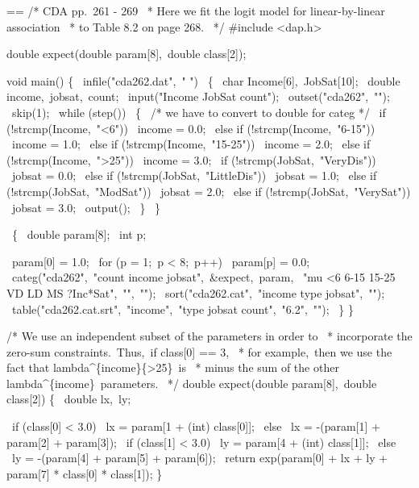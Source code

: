 \documentclass{book}
\makeatletter
\newenvironment{Texinfopreformatted}{%
  \par\GNUTobeylines\obeyspaces\frenchspacing\parskip=\z@\parindent=\z@}{}
{\catcode`\^^M=13 \gdef\GNUTobeylines{\catcode`\^^M=13 \def^^M{\null\par}}}
\newenvironment{Texinfoindented}{\begin{list}{}{}\item\relax}{\end{list}}
\renewcommand{\_}{\Texinfounderscore\discretionary{}{}{}}
\makeatother
\begin{document}
\begin{Texinfoindented}
\begin{Texinfopreformatted}%
\ttfamily 
/* CDA pp.\ 261 - 269
\ * Here we fit the logit model for linear-by-linear association
\ * to Table 8.2 on page 268.
\ */
\#include <dap.h>

double expect(double param[8],\ double class[2]);

void main()
\{
\  infile("cda262.dat",\ " ")
\    \{
\      char Income[6],\ JobSat[10];
\      double income,\ jobsat,\ count;
\      input("Income JobSat count");
\      outset("cda262",\ "");
\      skip(1);
\      while (step()) 
\        \{
\          /* we have to convert to double for categ */
\          if (!strcmp(Income,\ "<6"))
\            income = 0.0;
\          else if (!strcmp(Income,\ "6-15"))
\            income = 1.0;
\          else if (!strcmp(Income,\ "15-25"))
\            income = 2.0;
\          else if (!strcmp(Income,\ ">25"))
\            income = 3.0;
\          if (!strcmp(JobSat,\ "VeryDis"))
\            jobsat = 0.0;
\          else if (!strcmp(JobSat,\ "LittleDis"))
\            jobsat = 1.0;
\          else if (!strcmp(JobSat,\ "ModSat"))
\            jobsat = 2.0;
\          else if (!strcmp(JobSat,\ "VerySat"))
\            jobsat = 3.0;
\          output();
\        \}
\    \}

\  \{
\    double param[8];
\    int p;

\    param[0] = 1.0;
\    for (p = 1;\ p < 8;\ p++)
\      param[p] = 0.0;
\    categ("cda262",\ "count income jobsat",\ \&expect,\ param,
\          "mu <6 6-15 15-25 VD LD MS ?Inc*Sat",\ "",\ "");
\    sort("cda262.cat",\ "income \_type\_ jobsat",\ "");
\    table("cda262.cat.srt",\ "income",\ "\_type\_ jobsat count",\ "6.2",\ "");
\  \}
\}

/* We use an independent subset of the parameters in order to
\ * incorporate the zero-sum constraints.\ Thus,\ if class[0] == 3,
\ * for example,\ then we use the fact that lambda\^{}\{income\}\_\{>25\}\ is
\ * minus the sum of the other lambda\^{}\{income\}\ parameters.
\ */
double expect(double param[8],\ double class[2])
\{
\  double lx,\ ly;

\  if (class[0] < 3.0)
\    lx = param[1 + (int) class[0]];
\  else
\    lx = -(param[1] + param[2] + param[3]);
\  if (class[1] < 3.0)
\    ly = param[4 + (int) class[1]];
\  else
\    ly = -(param[4] + param[5] + param[6]);
\  return exp(param[0] + lx + ly + param[7] * class[0] * class[1]);
\}

\end{Texinfopreformatted}
\end{Texinfoindented}
\end{document}
